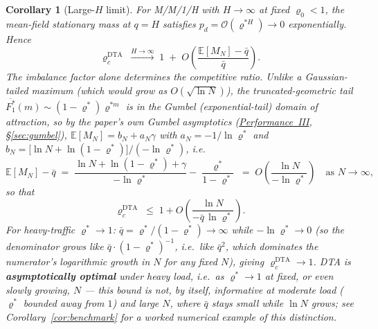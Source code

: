 \documentclass[11pt,a4paper]{article}
\newtheorem{corollary}[theorem]{Corollary}
\begin{document}
\begin{corollary}[Large-$H$ limit]\label{cor:large_H}
For M/M/1/H with $H \to \infty$ at fixed $\varrho_0 < 1$,
the mean-field stationary mass at $q = H$ satisfies
$p_d = \mathcal{O}(\varrho^{*H}) \to 0$ exponentially.  Hence
\[
  \varrho_c^{\mathrm{DTA}} \;\xrightarrow{H\to\infty}\; 1
  \;+\; O\!\left(\frac{\mathbb{E}[M_N] - \bar q}{\bar q}\right).
\]
The imbalance factor alone determines the competitive ratio. Unlike a
Gaussian-tailed maximum (which would grow as $O(\sqrt{\ln N})$), the
truncated-geometric tail $\overline{F_1^*}(m) \sim (1-\varrho^*)\varrho^{*m}$
is in the \emph{Gumbel} (exponential-tail) domain of attraction, so by
the paper's own Gumbel asymptotics
(\hyperref[chap:makespan]{Performance~III}, \S\ref{sec:gumbel}),
$\mathbb{E}[M_N] = b_N + a_N\gamma$ with $a_N = -1/\ln\varrho^*$ and
$b_N = \bigl[\ln N + \ln(1-\varrho^*)\bigr]/(-\ln\varrho^*)$, i.e.
\begin{equation}\label{eq:cr_large_H}
  \mathbb{E}[M_N] - \bar q
  \;=\;
  \frac{\ln N + \ln(1-\varrho^*) + \gamma}{-\ln\varrho^*} - \frac{\varrho^*}{1-\varrho^*}
  \;=\; O\!\left(\frac{\ln N}{-\ln\varrho^*}\right)
  \quad\text{as } N \to \infty,
\end{equation}
so that
\[
  \varrho_c^{\mathrm{DTA}} \;\le\; 1 + O\!\left(\frac{\ln N}{-\bar q\,\ln\varrho^*}\right).
\]
For heavy-traffic $\varrho^* \to 1$: $\bar q = \varrho^*/(1-\varrho^*) \to
\infty$ while $-\ln\varrho^* \to 0$ (so the denominator grows like
$\bar q \cdot (1-\varrho^*)^{-1}$, i.e.\ like $\bar q^2$, which dominates
the numerator's logarithmic growth in $N$ for any fixed $N$), giving
$\varrho_c^{\mathrm{DTA}} \to 1$.  DTA is \textbf{asymptotically optimal}
under heavy load, i.e.\ as $\varrho^* \to 1$ \emph{at fixed, or even slowly
growing, $N$} --- this bound is \emph{not}, by itself, informative at
moderate load ($\varrho^*$ bounded away from $1$) and large $N$, where
$\bar q$ stays small while $\ln N$ grows; see
Corollary~\ref{cor:benchmark} for a worked numerical example of this
distinction.
\end{corollary}
\end{document}
